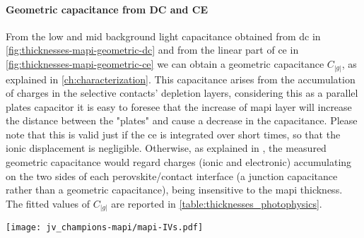	\paragraph{Geometric capacitance from DC and CE}
	From the low and mid background light capacitance obtained from \gls{dc} in \cref{fig:thicknesses-mapi-geometric-dc} and from the linear part of \gls{ce} in \cref{fig:thicknesses-mapi-geometric-ce} we can obtain a geometric capacitance $C_|g|$, as explained in \cref{ch:characterization}.
	This capacitance arises from the accumulation of charges in the selective contacts' depletion layers, considering this as a parallel plates capacitor it is easy to foresee that the increase of \gls{mapi} layer will increase the distance between the "plates" and cause a decrease in the capacitance.
	Please note that this is valid just if the \gls{ce} is integrated over short times, so that the ionic displacement is negligible.
	Otherwise, as explained in , the measured geometric capacitance would regard charges (ionic and electronic) accumulating on the two sides of each perovskite\-/contact interface (a junction capacitance rather than a geometric capacitance), being insensitive to the \gls{mapi} thickness.
	The fitted values of $C_|g|$ are reported in \cref{table:thicknesses_photophysics}.

	\begin{SCfigure}
	\centering
	\texttt{[image: jv\_champions-mapi/mapi-IVs.pdf]}
	\label{fig:thicknesses-jv_champions-mapi}
\end{SCfigure}

